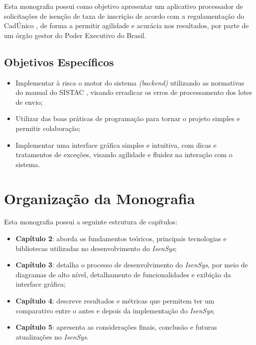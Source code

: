\documentclass[
	12pt,			%
	openright,		%
	oneside,	
	a4paper,		%
	english,		%
	brazil			%
]{abntex2/abntex2}  %
\begin{document}
			Esta monografia possui como objetivo apresentar um aplicativo processador de solicitações de isenção de taxa de inscrição de acordo com a regulamentação do CadÚnico \cite{cadunico-decreto}, de forma a permitir agilidade e acurácia nos resultados, por parte de um órgão gestor do Poder Executivo do Brasil.
			
			\subsection{Objetivos Específicos}
			
			\begin{itemize}
				
				\item Implementar à risca o motor do sistema \textit{(backend)} utilizando as normativas do manual do SISTAC \cite{sistac-formatos}, visando erradicar os erros de processamento dos lotes de envio;
				\item Utilizar das boas práticas de programação para tornar o projeto simples e permitir colaboração;
				\item Implementar uma interface gráfica simples e intuitiva, com dicas e tratamentos de exceções, visando agilidade e fluidez na interação com o sistema.
				
			\end{itemize}
		
		\section{Organização da Monografia}
		
			Esta monografia possui a seguinte estrutura de capítulos:
			
			\begin{itemize}
				
				\item \textbf{Capítulo 2}: aborda os fundamentos teóricos, principais tecnologias e bibliotecas utilizadas no desenvolvimento do \textit{IsenSys};
				\item \textbf{Capítulo 3}: detalha o processo de desenvolvimento do \textit{IsenSys}, por meio de diagramas de alto nível, detalhamento de funcionalidades e exibição da interface gráfica;
				\item \textbf{Capítulo 4}: descreve resultados e métricas que permitem ter um comparativo entre o antes e depois da implementação do \textit{IsenSys};
				\item \textbf{Capítulo 5}: apresenta as considerações finais, conclusão e futuras atualizações no \textit{IsenSys}.
				
			\end{itemize}
	
\end{document}
